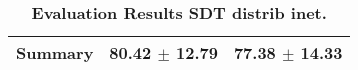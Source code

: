 \begin{table}[htb]
{\begin{tabular}{lll}
\midrule
\textbf{Summary                                  } &                  \phantom{0}80.42 $\pm$ 12.79 &                      \phantom{0}77.38 $\pm$ 14.33 \\
\bottomrule
\end{tabular}%
}
\caption{\textbf{Evaluation Results SDT distrib inet.}}
\label{tab:eval-results}
\end{table}


